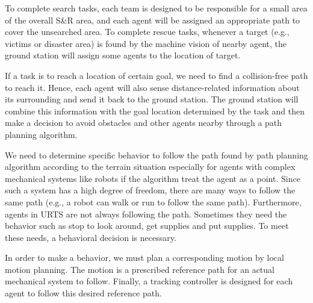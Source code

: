 \documentclass{ieeeaccess}
\begin{document}
To complete search tasks, each team is designed to be responsible for a small area of the overall S\&R area, and each agent will be assigned an appropriate path to cover the unsearched area. To complete rescue tasks, whenever a target (e.g., victims or disaster area) is found by the machine vision of nearby agent, the ground station will assign some agents to the location of target. 

If a task is to reach a location of certain goal, we need to find a collision-free path to reach it. 
Hence, each agent will also sense distance-related information about its surrounding and send it back to the ground station. The ground station will combine this information with the goal location determined by the task and then make a decision to avoid obstacles and other agents nearby through a path planning algorithm.

We need to determine specific behavior to follow the path found by path planning algorithm according to the terrain situation especially for agents with complex mechanical systems like robots if the algorithm treat the agent as a point. Since such a system has a high degree of freedom, there are many ways to follow the same path (e.g., a robot can walk or run to follow the same path). Furthermore, agents in URTS are not always following the path. Sometimes they need the behavior such as stop to look around, get supplies and put supplies. To meet these needs, a behavioral decision is necessary.

In order to make a behavior, we must plan a corresponding motion by local motion planning. The motion is a prescribed reference path for an actual mechanical system to follow. Finally, a tracking controller is designed for each agent to follow this desired reference path.
\end{document}
